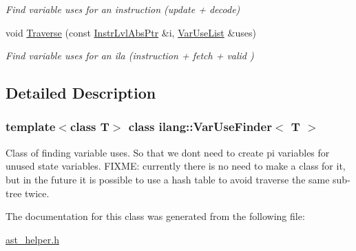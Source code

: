 \begin{DoxyCompactItemize}
\begin{DoxyCompactList}\small\item\em Find variable uses for an instruction (update + decode) \end{DoxyCompactList}\item 
\mbox{\label{classilang_1_1_var_use_finder_afad2542fa94918b108595c0cdf136eaf}} 
void \mbox{\hyperlink{classilang_1_1_var_use_finder_afad2542fa94918b108595c0cdf136eaf}{Traverse}} (const \mbox{\hyperlink{namespaceilang_ad1b30fdf347e493b3937143da05d1a72}{Instr\+Lvl\+Abs\+Ptr}} \&i, \mbox{\hyperlink{classilang_1_1_var_use_finder_ab66effc0aea4f940ad1c7fed68151925}{Var\+Use\+List}} \&uses)
\begin{DoxyCompactList}\small\item\em Find variable uses for an ila (instruction + fetch + valid ) \end{DoxyCompactList}\end{DoxyCompactItemize}


\subsection{Detailed Description}
\subsubsection*{template$<$class T$>$\newline
class ilang\+::\+Var\+Use\+Finder$<$ T $>$}

Class of finding variable uses. So that we don\textquotesingle{}t need to create pi variables for unused state variables. F\+I\+X\+ME\+: currently there is no need to make a class for it, but in the future it is possible to use a hash table to avoid traverse the same sub-\/tree twice. 

The documentation for this class was generated from the following file\+:\begin{DoxyCompactItemize}
\item 
\mbox{\hyperlink{ast__helper_8h}{ast\+\_\+helper.\+h}}\end{DoxyCompactItemize}
